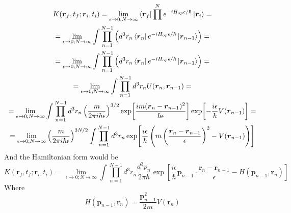 \documentclass{article}
\begin{document}
\begin{equation}
\begin{gathered}
    K(\boldsymbol{r}_f, t_f; \boldsymbol{r}_i, t_i) = \lim_{\epsilon\rightarrow0;N\rightarrow\infty}\bra{\boldsymbol{r}_f}\prod^{N} e^{-i H_{op}\epsilon/\hbar} \ket{\boldsymbol{r}_i} = \\
    = \lim_{\epsilon\rightarrow0;N\rightarrow\infty}\int \prod_{n=1}^{N-1}\left(d^3r_n
    \bra{\boldsymbol{r}_n} e^{-i H_{op}\epsilon/\hbar} \ket{\boldsymbol{r}_{n-1}}\right) = \\
    = \lim_{\epsilon\rightarrow0;N\rightarrow\infty}\int \prod_{n=1}^{N-1}\left(d^3r_n
    \bra{\boldsymbol{r}_n} e^{-i H_{op}\epsilon/\hbar} \ket{\boldsymbol{r}_{n-1}}\right) = \\
    = \lim_{\epsilon\rightarrow0;N\rightarrow\infty}\int \prod_{n=1}^{N-1}d^3r_n
    U(\boldsymbol{r}_n, \boldsymbol{r}_{n-1}) = \\
    = \lim_{\epsilon\rightarrow0;N\rightarrow\infty}\int \prod_{n=1}^{N-1}d^3r_n
    \left(\frac{m}{2\pi i\hbar\epsilon}\right)^{3/2} \exp[\frac{im(\boldsymbol{r}_n - \boldsymbol{r}_{n-1})^2}{\hbar\epsilon}]\exp[-\frac{i\epsilon}{\hbar}V(\boldsymbol{r}_{n-1})] = \\
    = \lim_{\epsilon\rightarrow0;N\rightarrow\infty}\left(\frac{m}{2\pi i\hbar\epsilon}\right)^{3N/2} \int \prod_{n=1}^{N-1}d^3r_n
    \exp[\frac{i\epsilon}{\hbar}\left(m\left(\frac{\boldsymbol{r}_n - \boldsymbol{r}_{n-1}}{\epsilon}\right)^2-V(\boldsymbol{r}_{n-1})\right)]
\end{gathered}
\end{equation}
And the Hamiltonian form would be
\begin{equation}
    K(\boldsymbol{r}_f, t_f; \boldsymbol{r}_i, t_i) = 
    \lim_{\epsilon\rightarrow0;N\rightarrow\infty}\int \prod_{n=1}^{N-1}d^3r_n \frac{d^3p_n}{2\pi\hbar} \exp[\frac{i\epsilon}{\hbar}\boldsymbol{p}_{n-1}\cdot\frac{\boldsymbol{r}_n - \boldsymbol{r}_{n-1}}{\epsilon} - H(\boldsymbol{p}_{n-1}, \boldsymbol{r}_n)]
\end{equation}
Where
\begin{equation}
    H(\boldsymbol{p}_{n-1}, \boldsymbol{r}_n) = \frac{\boldsymbol{p}_{n-1}^2}{2m} V(\boldsymbol{r}_n)
\end{equation}
\end{document}
